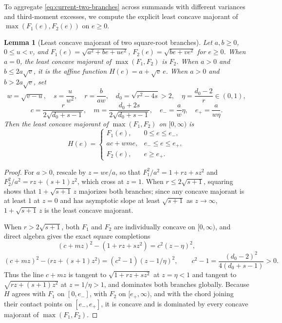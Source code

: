 \documentclass[11pt]{article}
\numberwithin{equation}{section}
\newtheorem{lemma}[theorem]{Lemma}
\theoremstyle{remark}
\begin{document}
To aggregate \eqref{eq:current-two-branches} across summands with different
variances and third-moment excesses, we compute the explicit least concave
majorant of $\max(F_1(e),F_2(e))$ on $e\ge0$.

\begin{lemma}[Least concave majorant of two square-root branches]\label{lem:current-concave}
Let $a,b\ge0$, $0\le u<v$, and $F_1(e)=\sqrt{a^2+be+ue^2}$,
$F_2(e)=\sqrt{be+ve^2}$ for $e\ge0$. When $a=0$, the least concave majorant
of $\max(F_1,F_2)$ is $F_2$. When $a>0$ and $b\le2a\sqrt v$, it is the
affine function $H(e)=a+\sqrt v\,e$. When $a>0$ and $b>2a\sqrt v$, set
\[
 w=\sqrt{v-u},\quad s=\frac{u}{w^2},\quad r=\frac{b}{aw},\quad
 d_0=\sqrt{r^2-4s}>2,\quad \eta=\frac{d_0-2}{r}\in(0,1),
\]
\[
 c=\frac r{2\sqrt{d_0+s-1}},\quad
 m=\frac{d_0+2s}{2\sqrt{d_0+s-1}},\quad
 e_-=\frac{a}{w}\eta,\quad e_+=\frac{a}{w\eta}.
\]
Then the least concave majorant of $\max(F_1,F_2)$ on $[0,\infty)$ is
\[
 H(e)=\begin{cases}
 F_1(e),&0\le e\le e_-,\\
 ac+wm e,&e_-\le e\le e_+,\\
 F_2(e),&e\ge e_+.
 \end{cases}
\]
\end{lemma}
\begin{proof}
For $a>0$, rescale by $z=we/a$, so that $F_1^2/a^2=1+rz+sz^2$ and
$F_2^2/a^2=rz+(s+1)z^2$, which cross at $z=1$. When $r\le2\sqrt{s+1}$,
squaring shows that $1+\sqrt{s+1}\,z$ majorizes both branches; since any
concave majorant is at least $1$ at $z=0$ and has asymptotic slope at least
$\sqrt{s+1}$ as $z\to\infty$, $1+\sqrt{s+1}\,z$ is the least concave
majorant.

When $r>2\sqrt{s+1}$, both $F_1$ and $F_2$ are individually concave on
$[0,\infty)$, and direct algebra gives the exact square completions
\[
 (c+mz)^2-(1+rz+sz^2)=c^2(z-\eta)^2,
\]
\[
 (c+mz)^2-\bigl(rz+(s+1)z^2\bigr)=(c^2-1)(z-1/\eta)^2,
 \qquad c^2-1=\frac{(d_0-2)^2}{4(d_0+s-1)}>0.
\]
Thus the line $c+mz$ is tangent to $\sqrt{1+rz+sz^2}$ at $z=\eta<1$ and
tangent to $\sqrt{rz+(s+1)z^2}$ at $z=1/\eta>1$, and dominates both branches
globally. Because $H$ agrees with $F_1$ on $[0,e_-]$, with $F_2$ on
$[e_+,\infty)$, and with the chord joining their contact points on
$[e_-,e_+]$, it is concave and is dominated by every concave majorant of
$\max(F_1,F_2)$.
\end{proof}
\end{document}
